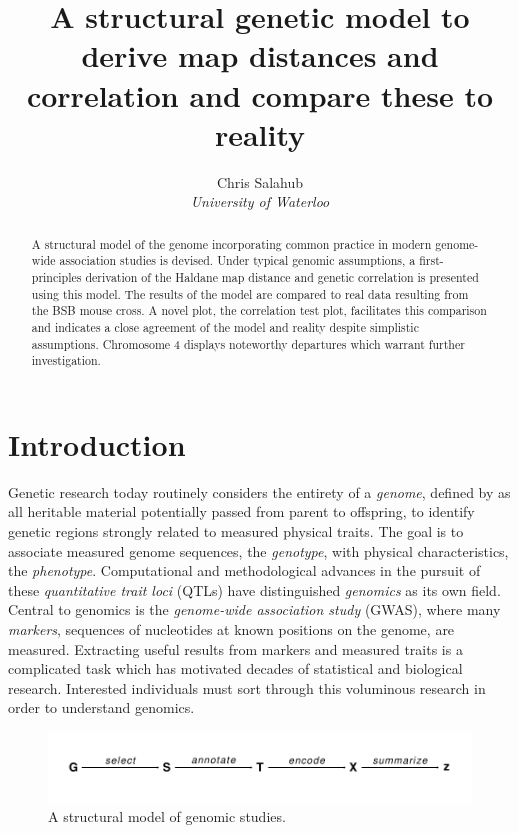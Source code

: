 \documentclass{article}
\title{A structural genetic model to derive map distances and correlation and compare these to reality}
\author{Chris Salahub \\
	\textit{University of Waterloo}}
\begin{document}
	
\maketitle

\begin{abstract}
  A structural model of the genome incorporating common practice in modern genome-wide association studies is devised. Under typical genomic assumptions, a first-principles derivation of the Haldane map distance and genetic correlation is presented using this model. The results of the model are compared to real data resulting from the BSB mouse cross. A novel plot, the correlation test plot, facilitates this comparison and indicates a close agreement of the model and reality despite simplistic assumptions. Chromosome 4 displays noteworthy departures which warrant further investigation.
\end{abstract}

\section{Introduction} \label{sec:intro}

Genetic research today routinely considers the entirety of a \emph{genome}, defined by \cite{doergeetal1997search} as all heritable material potentially passed from parent to offspring, to identify genetic regions strongly related to measured physical traits. The goal is to associate measured genome sequences, the \emph{genotype}, with physical characteristics, the \emph{phenotype}. Computational and methodological advances in the pursuit of these \emph{quantitative trait loci} (QTLs) have distinguished \emph{genomics} as its own field. Central to genomics is the \emph{genome-wide association study} (GWAS), where many \emph{markers}, sequences of nucleotides at known positions on the genome, are measured. Extracting useful results from markers and measured traits is a complicated task which has motivated decades of statistical and biological research. Interested individuals must sort through this voluminous research in order to understand genomics.

\begin{figure}[!ht]
  \begin{center}
  \includegraphics[scale = 1]{./img/modelDiagram.pdf}
  \caption{A structural model of genomic studies.}
  \label{fig:modelDiagram}
\end{center}
\end{figure}
\end{document}

